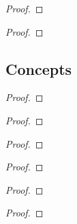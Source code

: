 \begin{proof}
\end{proof}

\begin{exercise}
\end{exercise}

\begin{proof}
\end{proof}

\subsection*{Concepts}

\begin{exercise}
\end{exercise}

\begin{proof}
\end{proof}

\begin{exercise}
\end{exercise}

\begin{proof}
\end{proof}

\begin{exercise}
\end{exercise}

\begin{proof}
\end{proof}

\begin{exercise}
\end{exercise}

\begin{proof}
\end{proof}

\begin{exercise}
\end{exercise}

\begin{proof}
\end{proof}

\begin{exercise}
\end{exercise}

\begin{proof}
\end{proof}

